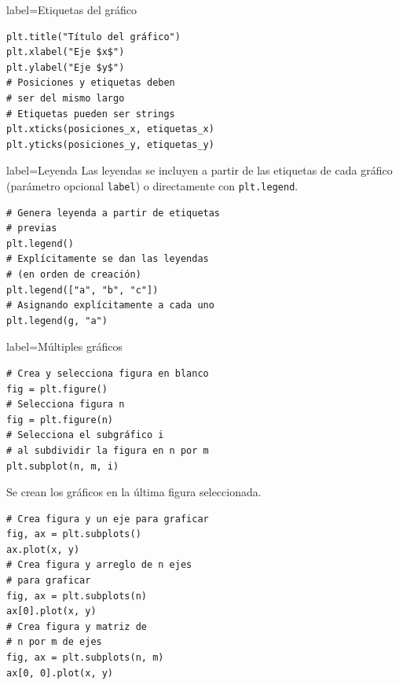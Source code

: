 \documentclass[10pt]{article}
\begin{document}
\begin{multicols*}{3}
\begin{contentbox}{label=Etiquetas del gráfico}
\begin{lstlisting}
plt.title("Título del gráfico")
plt.xlabel("Eje $x$")
plt.ylabel("Eje $y$")
# Posiciones y etiquetas deben
# ser del mismo largo
# Etiquetas pueden ser strings
plt.xticks(posiciones_x, etiquetas_x)
plt.yticks(posiciones_y, etiquetas_y)
\end{lstlisting}
\end{contentbox}

\begin{contentbox}{label=Leyenda}
    Las leyendas se incluyen a partir de las etiquetas de cada gráfico (parámetro opcional \lstinline!label!) o directamente con \lstinline!plt.legend!.
    
\begin{lstlisting}
# Genera leyenda a partir de etiquetas
# previas
plt.legend()
# Explícitamente se dan las leyendas
# (en orden de creación)
plt.legend(["a", "b", "c"])
# Asignando explícitamente a cada uno
plt.legend(g, "a")
\end{lstlisting}
\end{contentbox}

\begin{contentbox}{label=Múltiples gráficos}
\begin{lstlisting}
# Crea y selecciona figura en blanco
fig = plt.figure()
# Selecciona figura n
fig = plt.figure(n)
# Selecciona el subgráfico i
# al subdividir la figura en n por m
plt.subplot(n, m, i)
\end{lstlisting}
    Se crean los gráficos en la última figura seleccionada.
\begin{lstlisting}
# Crea figura y un eje para graficar
fig, ax = plt.subplots()
ax.plot(x, y)
# Crea figura y arreglo de n ejes
# para graficar
fig, ax = plt.subplots(n)
ax[0].plot(x, y)
# Crea figura y matriz de
# n por m de ejes
fig, ax = plt.subplots(n, m)
ax[0, 0].plot(x, y)
\end{lstlisting}
\end{contentbox}

    

\end{multicols*}
\end{document}
